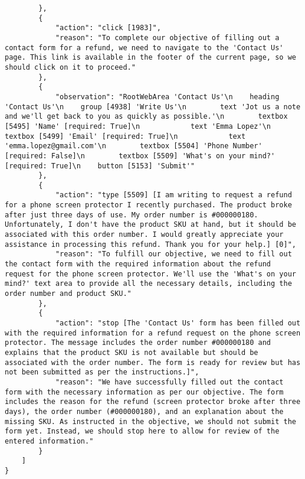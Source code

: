 \begin{tcolorbox}[breakable]
\begin{lstlisting}
        },
        {
            "action": "click [1983]",
            "reason": "To complete our objective of filling out a contact form for a refund, we need to navigate to the 'Contact Us' page. This link is available in the footer of the current page, so we should click on it to proceed."
        },
        {
            "observation": "RootWebArea 'Contact Us'\n    heading 'Contact Us'\n    group [4938] 'Write Us'\n        text 'Jot us a note and we'll get back to you as quickly as possible.'\n        textbox [5495] 'Name' [required: True]\n            text 'Emma Lopez'\n        textbox [5499] 'Email' [required: True]\n            text 'emma.lopez@gmail.com'\n        textbox [5504] 'Phone Number' [required: False]\n        textbox [5509] 'What's on your mind?' [required: True]\n    button [5153] 'Submit'"
        },
        {
            "action": "type [5509] [I am writing to request a refund for a phone screen protector I recently purchased. The product broke after just three days of use. My order number is #000000180. Unfortunately, I don't have the product SKU at hand, but it should be associated with this order number. I would greatly appreciate your assistance in processing this refund. Thank you for your help.] [0]",
            "reason": "To fulfill our objective, we need to fill out the contact form with the required information about the refund request for the phone screen protector. We'll use the 'What's on your mind?' text area to provide all the necessary details, including the order number and product SKU."
        },
        {
            "action": "stop [The 'Contact Us' form has been filled out with the required information for a refund request on the phone screen protector. The message includes the order number #000000180 and explains that the product SKU is not available but should be associated with the order number. The form is ready for review but has not been submitted as per the instructions.]",
            "reason": "We have successfully filled out the contact form with the necessary information as per our objective. The form includes the reason for the refund (screen protector broke after three days), the order number (#000000180), and an explanation about the missing SKU. As instructed in the objective, we should not submit the form yet. Instead, we should stop here to allow for review of the entered information."
        }
    ]
}
\end{lstlisting}





\end{tcolorbox}
